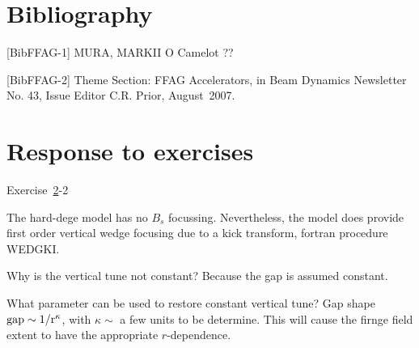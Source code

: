 \section{Bibliography}

[BibFFAG-1] MURA, MARKII
O Camelot ??


[BibFFAG-2]
Theme Section: FFAG Accelerators, 
in 
Beam Dynamics Newsletter No. 43, 
Issue Editor C.R. Prior, 
August~2007.



\section{Response to exercises \label{secFFAGExResp}}

\noindent {\small $\bullet$} Exercise~\ref{}-2 

The hard-dege model has no $B_s$ focussing. Nevertheless, the model 
does provide first order vertical wedge focusing due to a kick transform, fortran procedure \textrm{WEDGKI}. 

Why is the vertical tune not constant? Because the gap is assumed constant.

What parameter can be used to restore constant vertical tune? Gap shape $\rm gap \sim 1/r^{\kappa}$, 
with $\kappa\sim$ a few units to be determine. This will cause the firnge field 
extent to have the appropriate $r$-dependence. 
